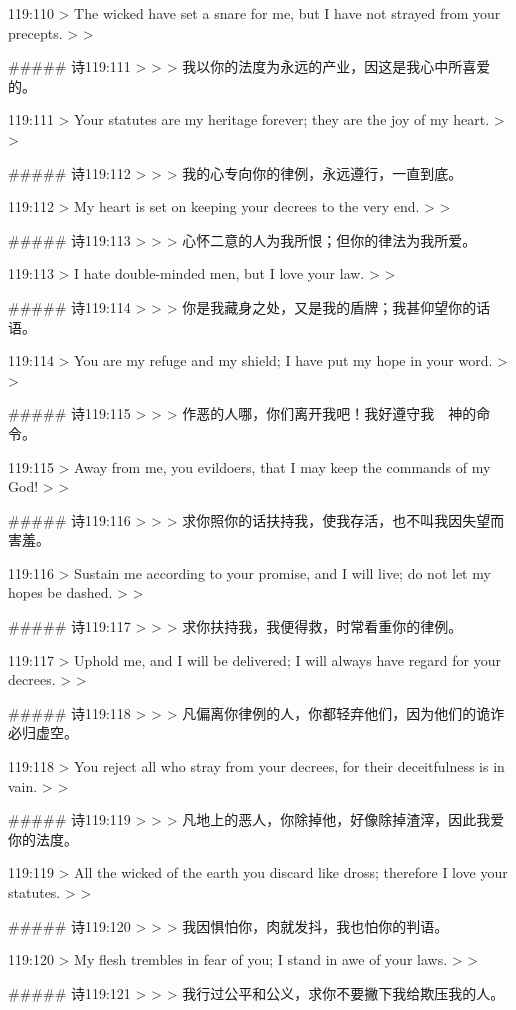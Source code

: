 119:110
> The wicked have set a snare for me, but I have not strayed from your precepts.
>
> 


##### 诗119:111
> 
>
> 我以你的法度为永远的产业，因这是我心中所喜爱的。


119:111
> Your statutes are my heritage forever; they are the joy of my heart.
>
> 


##### 诗119:112
> 
>
> 我的心专向你的律例，永远遵行，一直到底。


119:112
> My heart is set on keeping your decrees to the very end.
>
> 


##### 诗119:113
> 
>
> 心怀二意的人为我所恨；但你的律法为我所爱。


119:113
> I hate double-minded men, but I love your law.
>
> 


##### 诗119:114
> 
>
> 你是我藏身之处，又是我的盾牌；我甚仰望你的话语。


119:114
> You are my refuge and my shield; I have put my hope in your word.
>
> 


##### 诗119:115
> 
>
> 作恶的人哪，你们离开我吧！我好遵守我　神的命令。


119:115
> Away from me, you evildoers, that I may keep the commands of my God!
>
> 


##### 诗119:116
> 
>
> 求你照你的话扶持我，使我存活，也不叫我因失望而害羞。


119:116
> Sustain me according to your promise, and I will live; do not let my hopes be dashed.
>
> 


##### 诗119:117
> 
>
> 求你扶持我，我便得救，时常看重你的律例。


119:117
> Uphold me, and I will be delivered; I will always have regard for your decrees.
>
> 


##### 诗119:118
> 
>
> 凡偏离你律例的人，你都轻弃他们，因为他们的诡诈必归虚空。


119:118
> You reject all who stray from your decrees, for their deceitfulness is in vain.
>
> 


##### 诗119:119
> 
>
> 凡地上的恶人，你除掉他，好像除掉渣滓，因此我爱你的法度。


119:119
> All the wicked of the earth you discard like dross; therefore I love your statutes.
>
> 


##### 诗119:120
> 
>
> 我因惧怕你，肉就发抖，我也怕你的判语。


119:120
> My flesh trembles in fear of you; I stand in awe of your laws.
>
> 


##### 诗119:121
> 
>
> 我行过公平和公义，求你不要撇下我给欺压我的人。



